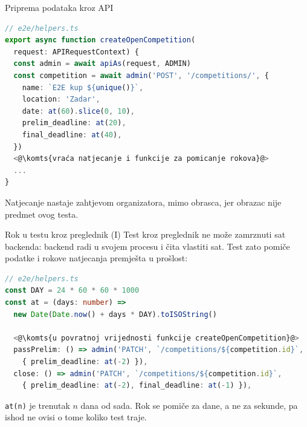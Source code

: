 \begin{frame}[fragile]{Priprema podataka kroz API}
\begin{lstlisting}[language=typescript]
// e2e/helpers.ts
export async function createOpenCompetition(
  request: APIRequestContext) {
  const admin = await apiAs(request, ADMIN)
  const competition = await admin('POST', '/competitions/', {
    name: `E2E kup ${unique()}`,
    location: 'Zadar',
    date: at(60).slice(0, 10),
    prelim_deadline: at(20),
    final_deadline: at(40),
  })
  <@\komts{vraća natjecanje i funkcije za pomicanje rokova}@>
  ...
}
\end{lstlisting}

\vspace{0.3em}
Natjecanje nastaje zahtjevom organizatora, mimo obrasca, jer obrazac nije predmet ovog testa.
\end{frame}

\begin{frame}[fragile]{Rok u testu kroz preglednik (I)}
Test kroz preglednik ne može zamrznuti sat backenda: backend radi u svojem procesu i čita vlastiti sat. Test zato pomiče podatke i rokove natjecanja premješta u prošlost:

\begin{lstlisting}[language=typescript]
// e2e/helpers.ts
const DAY = 24 * 60 * 60 * 1000
const at = (days: number) =>
  new Date(Date.now() + days * DAY).toISOString()

  <@\komts{u povratnoj vrijednosti funkcije createOpenCompetition}@>
  passPrelim: () => admin('PATCH', `/competitions/${competition.id}`,
    { prelim_deadline: at(-2) }),
  close: () => admin('PATCH', `/competitions/${competition.id}`,
    { prelim_deadline: at(-2), final_deadline: at(-1) }),
\end{lstlisting}

\vspace{0.3em}
\texttt{at(n)} je trenutak $n$ dana od sada. Rok se pomiče za dane, a ne za sekunde, pa ishod ne ovisi o tome koliko test traje.
\end{frame}


